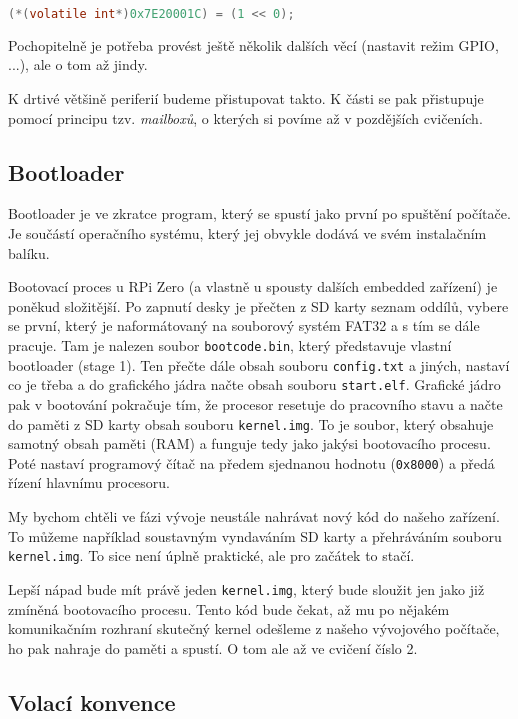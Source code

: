 \documentclass{article}
\begin{document}
\begin{lstlisting}[language=C]
(*(volatile int*)0x7E20001C) = (1 << 0);
\end{lstlisting}

Pochopitelně je potřeba provést ještě několik dalších věcí (nastavit režim GPIO, ...), ale o tom až jindy.

K drtivé většině periferií budeme přistupovat takto. K části se pak přistupuje pomocí principu tzv. \emph{mailboxů}, o kterých si povíme až v pozdějších cvičeních.

\subsection{Bootloader}

Bootloader je ve zkratce program, který se spustí jako první po spuštění počítače. Je součástí operačního systému, který jej obvykle dodává ve svém instalačním balíku.

Bootovací proces u RPi Zero (a vlastně u spousty dalších embedded zařízení) je poněkud složitější. Po zapnutí desky je přečten z SD karty seznam oddílů, vybere se první, který je naformátovaný na souborový systém FAT32 a s tím se dále pracuje. Tam je nalezen soubor \texttt{bootcode.bin}, který představuje vlastní bootloader (stage 1). Ten přečte dále obsah souboru \texttt{config.txt} a jiných, nastaví co je třeba a do grafického jádra načte obsah souboru \texttt{start.elf}. Grafické jádro pak v bootování pokračuje tím, že procesor resetuje do pracovního stavu a načte do paměti z SD karty obsah souboru \texttt{kernel.img}. To je soubor, který obsahuje samotný obsah paměti (RAM) a funguje tedy jako jakýsi  bootovacího procesu. Poté nastaví programový čítač na předem sjednanou hodnotu (\texttt{0x8000}) a předá řízení hlavnímu procesoru.

My bychom chtěli ve fázi vývoje neustále nahrávat nový kód do našeho zařízení. To můžeme například soustavným vyndaváním SD karty a přehráváním souboru \texttt{kernel.img}. To sice není úplně praktické, ale pro začátek to stačí.

Lepší nápad bude mít právě jeden \texttt{kernel.img}, který bude sloužit jen jako již zmíněná  bootovacího procesu. Tento kód bude čekat, až mu po nějakém komunikačním rozhraní skutečný kernel odešleme z našeho vývojového počítače,  ho pak nahraje do paměti a spustí. O tom ale až ve cvičení číslo 2.

\subsection{Volací konvence}
\end{document}
